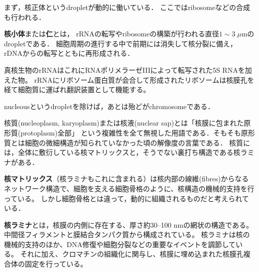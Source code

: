 \documentclass[uplatex, dvipdfmx]{jsreport}
\begin{document}
まず，核正体というdropletが動的に働いている．
ここではribosomeなどの合成も行われる．

\begin{definition}[nucleous]
    \textbf{核小体}または\textbf{仁}とは，
    rRNAの転写やribosomeの構築が行われる直径$1\sim 3\;\mu\mathrm{m}$のdropletである．
    細胞周期の進行する中で前期には消失して核分裂に備え，rDNAからの転写とともに再形成される．
\end{definition}
\begin{remark}[ribosomeはnucleousで生まれる]
    真核生物のrRNAはこれにRNAポリメラーゼIIIによって転写された5S RNAを加えた物。
    rRNAにリボソーム蛋白質が会合して形成されたリボソームは核膜孔を経て細胞質に運ばれ翻訳装置として機能する。
\end{remark}

nucleousというdropletを除けば，あとは殆どがchromosomeである．

核質(nucleoplasm, karyoplasm)または核液(nuclear sap)とは「核膜に包まれた原形質(protoplasm)全部」
という複雑性を全て無視した用語である．そもそも原形質とは細胞の微細構造が知られていなかった頃の解像度の言葉である．
核質には，全体に敷衍している核マトリックスと，そうでない裏打ち構造である核ラミナがある．

\begin{definition}
    \textbf{核マトリックス}（核ラミナもこれに含まれる）は核内部の線維(fibres)からなるネットワーク構造で、細胞を支える細胞骨格のように、核構造の機械的支持を行っている。
    しかし細胞骨格とは違って，動的に組織されるものだと考えられている．
\end{definition}

\begin{definition}
    \textbf{核ラミナ}とは，核膜の内側に存在する、厚さ約30–100 nmの網状の構造である。中間径フィラメントと膜結合タンパク質から構成されている。
    核ラミナは核の機械的支持のほか、DNA修復や細胞分裂などの重要なイベントを調節している。
    それに加え、クロマチンの組織化に関与し、核膜に埋め込まれた核膜孔複合体の固定を行っている。
\end{definition}
\end{document}

